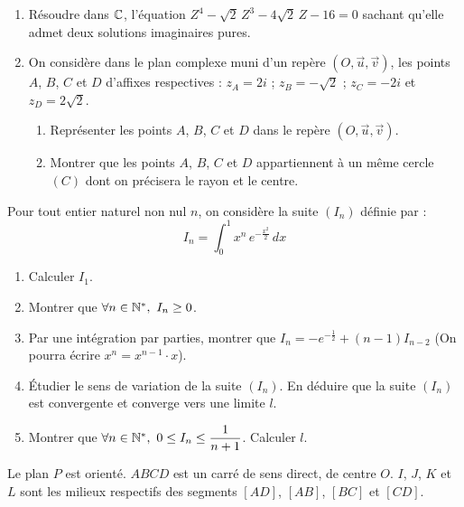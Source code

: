 \documentclass[11pt]{article}
\begin{document}


\begin{enumerate}
  \item Résoudre dans $\mathbb{C}$, l'équation $Z^4 - \sqrt{2}\,Z^3 - 4\sqrt{2}\,Z - 16 = 0$ sachant qu'elle admet deux solutions imaginaires pures.
  \item On considère dans le plan complexe muni d'un repère $(O,\vec{u},\vec{v})$, les points $A$, $B$, $C$ et $D$ d'affixes respectives : $z_A = 2i$ ; $z_B = -\sqrt{2}$ ; $z_C = -2i$ et $z_D = 2\sqrt{2}$.
  \begin{enumerate}[label=\alph*.]
    \item Représenter les points $A$, $B$, $C$ et $D$ dans le repère $(O,\vec{u},\vec{v})$.
    \item Montrer que les points $A$, $B$, $C$ et $D$ appartiennent à un même cercle $(C)$ dont on précisera le rayon et le centre.
  \end{enumerate}
\end{enumerate}


Pour tout entier naturel non nul $n$, on considère la suite $(I_n)$ définie par :
\[ I_n = \int_0^1 x^n\, e^{-\frac{x^2}{2}}\,dx \]

\begin{enumerate}
  \item Calculer $I_1$.
  \item Montrer que $\forall n \in \mathbb{N}^*,\ I_n \ge 0$.
  \item Par une intégration par parties, montrer que $I_n = -e^{-\frac{1}{2}} + (n-1)I_{n-2}$ (On pourra écrire $x^n = x^{n-1}\cdot x$).
  \item Étudier le sens de variation de la suite $(I_n)$. En déduire que la suite $(I_n)$ est convergente et converge vers une limite $l$.
  \item Montrer que $\forall n \in \mathbb{N}^*,\ 0 \le I_n \le \dfrac{1}{n+1}$. Calculer $l$.
\end{enumerate}


Le plan $P$ est orienté. $ABCD$ est un carré de sens direct, de centre $O$. $I$, $J$, $K$ et $L$ sont les milieux respectifs des segments $[AD]$, $[AB]$, $[BC]$ et $[CD]$.
\end{document}
